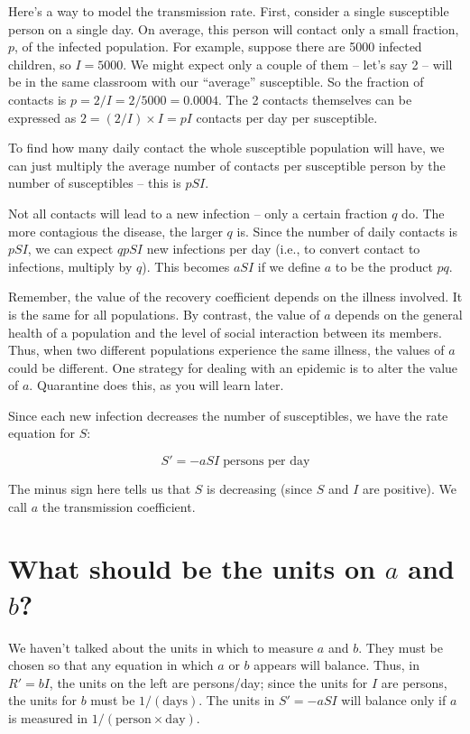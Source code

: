 \documentclass
[justified,nohyper]
{tufte-handout}
\begin{document}
Here's a way to model the transmission rate. First, consider a single susceptible 
person on a single day. On average, this person will contact only a small 
fraction, $p$, of the infected population. For example, suppose there are 5000 
infected children, so $I=5000$. We might expect only a couple of them -- let's 
say 2 -- will be in the same classroom with our ``average'' susceptible. So the 
fraction of contacts is $p=2/I = 2/5000= 0.0004$. The 2 contacts themselves can 
be expressed as $2=(2/I) \times I = pI$ contacts per day per susceptible.

To find how many daily contact the whole susceptible population will have, we can 
just multiply the average number of contacts per susceptible person by the number 
of susceptibles -- this is $pSI$.

Not all contacts will lead to a new infection -- only a certain fraction $q$ do. 
The more contagious the disease, the larger $q$ is. Since the number of daily 
contacts is $pSI$, we can expect $qpSI$ new infections per day (i.e., to convert 
contact to infections, multiply by $q$). This becomes $aSI$ if we define $a$ to 
be the product $pq$.

Remember, the value of the recovery coefficient depends on the illness involved. 
It is the same for all populations. By contrast, the value of $a$ depends on the 
general health of a population and the level of social interaction between its 
members. Thus, when two different populations experience the same illness, the 
values of $a$ could be different. One strategy for dealing with an epidemic is to 
alter the value of $a$. Quarantine does this, as you will learn later.

Since each new infection decreases the number of susceptibles, we have the rate 
equation for $S$:

\[
    S' = -aSI\;\text{persons per day}
\]

The minus sign here tells us that $S$ is decreasing (since $S$ and $I$ are 
positive). We call $a$ the transmission coefficient.

\section{What should be the units on $a$ and $b$?}
We haven't talked about the units in which to measure $a$ and $b$. They must be 
chosen so that any equation in which $a$ or $b$ appears will balance. Thus, in 
$R'=bI$, the units on the left are persons/day; since the units for $I$ are 
persons, the units for $b$ must be $1/(\text{days})$. The units in $S'=-aSI$ will 
balance only if $a$ is measured in $1/(\text{person}\times\text{day})$.
\end{document}
